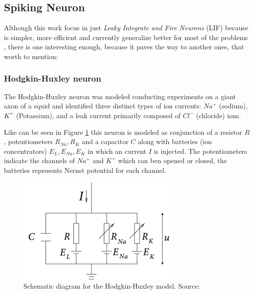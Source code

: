 	\subsection{Spiking Neuron}
		\par Although this work focus in just \textit{Leaky Integrate and Fire Neurons} (LIF) because is simpler, more efficient and currently generalize better for most of the problems \cite{dan_goodman_2022_7044500}, there is one interesting enough, because it paves the way to another ones, that worth to mention:
	
		\subsubsection{Hodgkin-Huxley neuron}
			\par The Hodgkin-Huxley neuron \cite{gerstner2014neuronal} was modeled conducting experiments on a giant axon of a squid and identified three distinct types of ion currents: $Na^+$ (sodium), $K^+$ (Potassium), and a leak current primarily composed of $Cl^-$ (chloride) ions.
			
			
			\begin{multicols}{2}
				\par Like can be seen in Figure \ref{fig:hodgkin-huxleymodel} this neuron is modeled as conjunction of a resistor $R$, potentiometers $R_{Na}, R_{K}$ and a capacitor $C$ along with  batteries (ion concentrators) $E_L, E_{Na}, E_K$  in which an current $I$ is injected. The potentiometers indicate the channels of $Na^+$ and $K^+$ which can ben opened or closed, the batteries represents Nernst potential \cite{2023Gibbs} for each channel.
			\columnbreak
				\begin{figure}[H]
					\centering
					\includegraphics[width=0.5\linewidth]{images/Hodgkin-HuxleyModel}
					\caption{Schematic diagram for the Hodgkin-Huxley model. Source: \cite{gerstner2014neuronal}}
					\label{fig:hodgkin-huxleymodel}
				\end{figure}
			\end{multicols}
			
